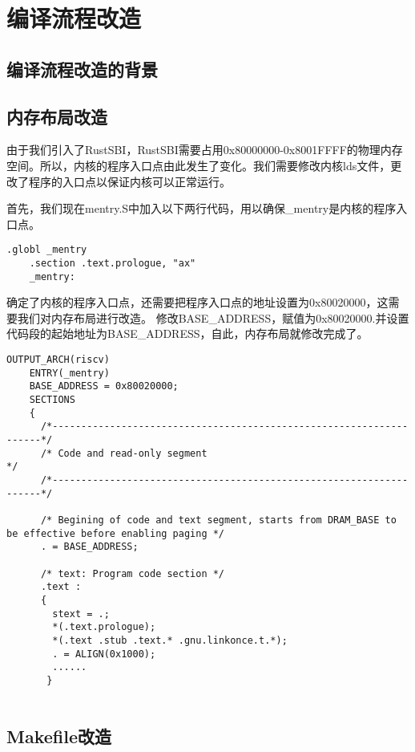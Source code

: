 \section{编译流程改造}

\subsection{编译流程改造的背景}

\subsection{内存布局改造}
由于我们引入了RustSBI，RustSBI需要占用0x80000000-0x8001FFFF的物理内存空间。所以，内核的程序入口点由此发生了变化。我们需要修改内核lds文件，更改了程序的入口点以保证内核可以正常运行。

首先，我们现在mentry.S中加入以下两行代码，用以确保\_mentry是内核的程序入口点。

\begin{lstlisting}[caption={修改内核程序入口点}, label={lst:change_kernel_entry}]
    .globl _mentry
    .section .text.prologue, "ax"
    _mentry:
\end{lstlisting}

确定了内核的程序入口点，还需要把程序入口点的地址设置为0x80020000，这需要我们对内存布局进行改造。
修改BASE\_ADDRESS，赋值为0x80020000.并设置代码段的起始地址为BASE\_ADDRESS，自此，内存布局就修改完成了。

\begin{lstlisting}[caption={修改内存布局}, label={lst:change_memory_layout}]
    OUTPUT_ARCH(riscv)
    ENTRY(_mentry)
    BASE_ADDRESS = 0x80020000;
    SECTIONS
    {
      /*--------------------------------------------------------------------*/
      /* Code and read-only segment                                         */
      /*--------------------------------------------------------------------*/
    
      /* Begining of code and text segment, starts from DRAM_BASE to be effective before enabling paging */
      . = BASE_ADDRESS;
      
      /* text: Program code section */
      .text : 
      {
        stext = .;
        *(.text.prologue);
        *(.text .stub .text.* .gnu.linkonce.t.*);
        . = ALIGN(0x1000);
        ......
       }
    
\end{lstlisting}

\subsection{Makefile改造}

